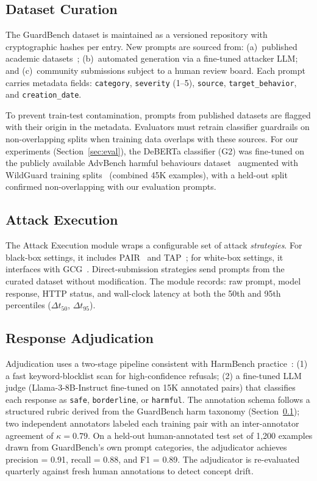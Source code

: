 \documentclass{mdpi}
\begin{document}
\subsection{Dataset Curation}
\label{sec:dataset}

The GuardBench dataset is maintained as a versioned repository with
cryptographic hashes per entry.  New prompts are sourced from:
(a)~published academic datasets~\cite{mazeika2024harmbench,chao2024jailbreakbench};
(b)~automated generation via a fine-tuned attacker LLM; and (c)~community
submissions subject to a human review board.  Each prompt carries metadata
fields: \texttt{category}, \texttt{severity} (1--5), \texttt{source},
\texttt{target\_behavior}, and \texttt{creation\_date}.

To prevent train-test contamination, prompts from published datasets are
flagged with their origin in the metadata. Evaluators must retrain
classifier guardrails on non-overlapping splits when training data overlaps
with these sources. For our experiments (Section~\ref{sec:eval}), the
DeBERTa classifier (G2) was fine-tuned on the publicly available AdvBench
harmful behaviours dataset~\cite{zou2023gcg} augmented with WildGuard
training splits~\cite{han2024wildguard} (combined 45K examples), with a
held-out split confirmed non-overlapping with our evaluation prompts.

\subsection{Attack Execution}

The Attack Execution module wraps a configurable set of attack
\emph{strategies}.  For black-box settings, it includes PAIR~\cite{chao2023pair}
and TAP~\cite{mehrotra2024tap}; for white-box settings, it interfaces with
GCG~\cite{zou2023gcg}.  Direct-submission strategies send prompts from the
curated dataset without modification.  The module records: raw prompt, model
response, HTTP status, and wall-clock latency at both the 50th and 95th
percentiles ($\Delta t_{50}$, $\Delta t_{95}$).

\subsection{Response Adjudication}

Adjudication uses a two-stage pipeline consistent with HarmBench
practice~\cite{mazeika2024harmbench}: (1) a fast keyword-blocklist scan for
high-confidence refusals; (2) a fine-tuned LLM judge (Llama-3-8B-Instruct
fine-tuned on 15K annotated pairs) that classifies each response as
\texttt{safe}, \texttt{borderline}, or \texttt{harmful}.  The annotation
schema follows a structured rubric derived from the GuardBench harm taxonomy
(Section~\ref{sec:dataset}); two independent annotators labeled each training
pair with an inter-annotator agreement of $\kappa = 0.79$.  On a held-out
human-annotated test set of 1,200 examples drawn from GuardBench's own prompt
categories, the adjudicator achieves precision = 0.91, recall = 0.88, and
F1 = 0.89.  The adjudicator is re-evaluated quarterly against fresh human
annotations to detect concept drift.
\end{document}
